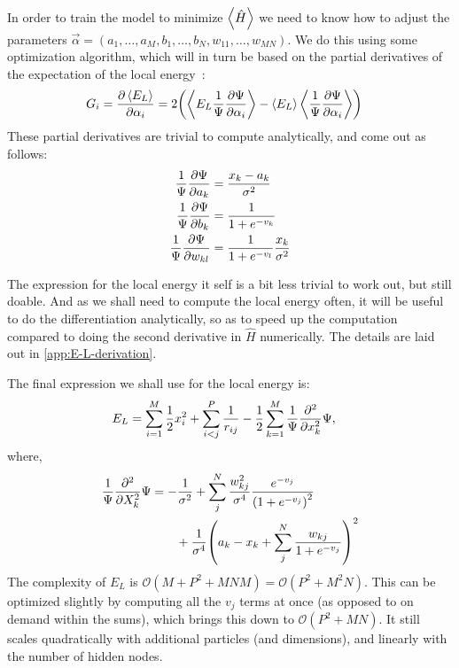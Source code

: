 \documentclass[a4paper, 11pt]{article}
\begin{document}
\begin{multicols}{2}
    In order to train the model to minimize $\expval{\hat H}$ we need to know
    how to adjust the parameters $\vec\alpha = (a_1,\dots,a_M,
    b_1,\dots,b_N,w_{11},\dots,w_{MN})$. We do this using some optimization
    algorithm, which will in turn be based on the partial derivatives of the
    expectation of the local energy~\cite{mhj-compphys-II}:
    \begin{align}
            G_i &= \pdv{\expval{E_L}}{\alpha_i} 
            = 2\qty(\expval{E_L
        \frac{1}{\Psi}\pdv{\Psi}{\alpha_i}} -
        \expval{E_L}\expval{\frac{1}{\Psi}\pdv{\Psi}{\alpha_i}})
    \end{align}
    These partial derivatives are trivial to compute analytically, and come out as
    follows:
    \begin{align}
        \frac{1}{\Psi}\pdv{\Psi}{a_k} &=
        \frac{x_k-a_k}{\sigma^2}\label{eq:pdv-a}\\
        \frac{1}{\Psi}\pdv{\Psi}{b_k} &= \frac{1}{1 +
        e^{-v_k}}\label{eq:pdv-b}\\
        \frac{1}{\Psi}\pdv{\Psi}{w_{kl}} &= \frac{1}{1 +
        e^{-v_l}}\frac{x_k}{\sigma^2}
    \end{align}

    The expression for the local energy it self is a bit less trivial to work
    out, but still doable. And as we shall need to compute the local energy often,
    it will be useful to do the differentiation analytically, so as to speed up
    the computation compared to doing the second derivative in $\hat H$
    numerically. The details are laid out in \autoref{app:E-L-derivation}.

    The final expression we shall use for the local energy is:
    \begin{align}
        E_L &= \sum_{i=1}^M \frac{1}{2}x_i^2 + \sum_{i<j}^{P} \frac{1}{r_{ij}}
        - \frac{1}{2} \sum_{k=1}^M
        \frac{1}{\Psi}\pdv[2]{}{x_k}\Psi,\label{eq:E-L-final-main-section}
    \end{align}
    where,
    \begin{align}
        \begin{split}
        \frac{1}{\Psi}\pdv[2]{}{X_k}\Psi 
        &= -\frac{1}{\sigma^2} + \sum_j^N
        \frac{w_{kj}^2}{\sigma^4}
        \frac{e^{-v_j}}{\qty(1+e^{-v_j})^2} \\
        &\quad{   }\quad{      }  +
        \frac{1}{\sigma^4}\qty(a_k-x_k+\sum_j^N \frac{w_{kj}}{1+e^{-v_j}})^2
        \end{split}
        \label{eq:E-L-second-deriv-main-section}
    \end{align}
    The complexity of $E_L$ is $\mathcal{O}(M + P^2 + MNM) = \mathcal{O}(P^2 +
    M^2 N)$. This can be optimized slightly by computing all the $v_j$ terms at
    once (as opposed to on demand within the sums), which brings this down to
    $\mathcal{O}(P^2 + MN)$. It still scales quadratically with additional
    particles (and dimensions), and linearly with the number of hidden nodes.


\end{multicols}
\end{document}
